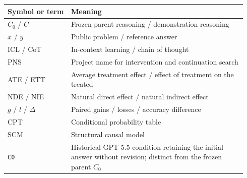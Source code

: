 \begingroup
\setlength{\tabcolsep}{2pt}
\begin{tabular}{@{}>{\raggedright\arraybackslash}p{0.25\linewidth}>{\raggedright\arraybackslash}p{0.69\linewidth}@{}}
\toprule
\textbf{Symbol or term} & \textbf{Meaning} \\
\midrule
$C_0$ / $C$ & Frozen parent reasoning / demonstration reasoning \\
$x$ / $y$ & Public problem / reference answer \\
ICL / CoT & In-context learning / chain of thought \\
PNS & Project name for intervention and continuation search \\
ATE / ETT & Average treatment effect / effect of treatment on the treated \\
NDE / NIE & Natural direct effect / natural indirect effect \\
$g$ / $l$ / $\Delta$ & Paired gains / losses / accuracy difference \\
CPT & Conditional probability table \\
SCM & Structural causal model \\
\texttt{C0} & Historical GPT-5.5 condition retaining the initial answer without revision; distinct from the frozen parent $C_0$ \\

\bottomrule
\end{tabular}
\endgroup
